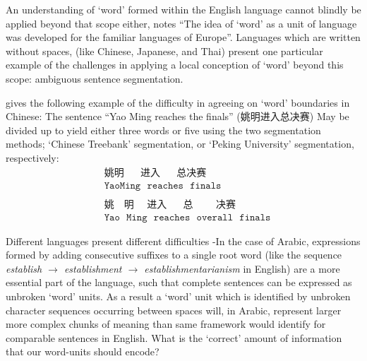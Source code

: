An understanding of `word' formed within the English language cannot blindly be applied beyond that scope either, \textcite{dixon02-word} notes ``The idea of `word' as a unit of language was developed for the familiar languages of Europe''. Languages which are written without spaces, (like Chinese, Japanese, and Thai) present one particular example of the challenges in applying a local conception of `word' beyond this scope: ambiguous sentence segmentation. 
\begin{example}
  \textcite{chen-2017-adversarial-multi} gives the following example of the difficulty in agreeing on `word' boundaries in Chinese: The sentence ``Yao Ming reaches the finals'' (姚明进入总决赛) May be divided up to yield either three words or five using the two segmentation methods; `Chinese Treebank' segmentation, or `Peking University' segmentation, respectively:
  \begin{align*}
    &\texttt{姚明~~~~~进入~~~~~总决赛~}\\\tag{Chinese Treebank}
    &\texttt{YaoMing~~reaches~~finals}\\
    \\
    &\texttt{姚~~~明~~~~进入~~~~~总~~~~~~~决赛}\\\tag{Peking University}
    &\texttt{Yao~~Ming~~reaches~~overall~~finals}
  \end{align*}
\end{example}
Different languages present different difficulties -In the case of Arabic, expressions formed by adding consecutive suffixes to a single root word (like the sequence \emph{establish $\to$ establishment $\to$ establishmentarianism} in English) are a more essential part of the language, such that complete sentences can be expressed as unbroken `word' units. As a result a `word' unit which is identified by unbroken character sequences occurring between spaces will, in Arabic, represent larger more complex chunks of meaning than same framework would identify for comparable sentences in English. What is the `correct' amount of information that our word-units should encode?

